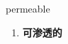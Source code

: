 
\begin{frame}
{\huge permeable}
\begin{center}
\begin{enumerate}\Large
  \item \textbf{可渗透的}
\end{enumerate}
\end{center}
\end{frame}
